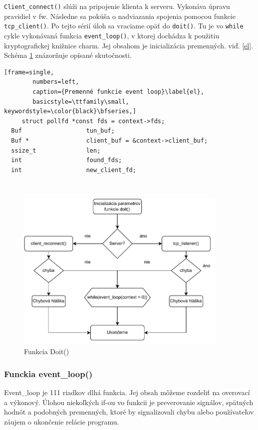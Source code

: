  
  \lstinline|Client_connect()| slúži na pripojenie klienta k serveru. Vykonáva úpravu pravidiel v \acrshort{fw}. Následne sa pokúša o nadviazania spojenia pomocou funkcie  \lstinline|tcp_client()|. Po tejto sérií úloh sa vraciame opäť do \lstinline|doit()|. Tu je vo  \lstinline|while| cykle vykonávaná funkcia \lstinline|event_loop()|, v ktorej dochádza k použitiu kryptografickej knižnice charm. Jej obsahom je inicializácia premenných. viď. \ref{el}. Schéma \ref{fc2} znázorňuje opísané skutočnosti.
  
  \begin{minipage}{\linewidth} 	
  	\begin{lstlisting}[frame=single,
  		numbers=left,
  		caption={Premenné funkcie event loop}\label{el},
  		basicstyle=\ttfamily\small, keywordstyle=\color{black}\bfseries,]
     struct pollfd *const fds = context->fds;
  Buf                  tun_buf;
  Buf *                client_buf = &context->client_buf;
  ssize_t              len;
  int                  found_fds;
  int                  new_client_fd;
    	\end{lstlisting}
\end{minipage}\\ 
 
 

\begin{figure}
	\centering
	\includegraphics[width=0.9\textwidth]{figures/fc2}
	\caption{Funkcia Doit()}
	\label{fc2}
\end{figure}

 \subsubsection{Funckia event\_loop()}
 Event\_loop je 111 riadkov dlhá funkcia. Jej obsah môžeme rozdeliť na overovací a výkonový. Úlohou niekoľkých if-ou vo funkcii je preverovanie signálov, spätných hodnôt a podobných premenných, ktoré by signalizovali chybu alebo používateľov záujem o ukončenie relácie programu. 
 
